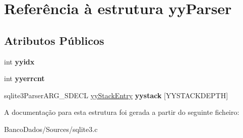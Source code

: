 \hypertarget{structyy_parser}{\section{Referência à estrutura yy\-Parser}
\label{structyy_parser}
}
\subsection*{Atributos Públicos}
\begin{DoxyCompactItemize}
\item 
\hypertarget{structyy_parser_a19abcf4780515fd2debd1ce7a2e29f95}{int {\bfseries yyidx}}\label{structyy_parser_a19abcf4780515fd2debd1ce7a2e29f95}

\item 
\hypertarget{structyy_parser_ac0350933aa515a3a756dfa742d04ee59}{int {\bfseries yyerrcnt}}\label{structyy_parser_ac0350933aa515a3a756dfa742d04ee59}

\item 
\hypertarget{structyy_parser_ae8bc1531d6ae56020a7ee33a40783672}{sqlite3\-Parser\-A\-R\-G\-\_\-\-S\-D\-E\-C\-L \hyperlink{structyy_stack_entry}{yy\-Stack\-Entry} {\bfseries yystack} \mbox{[}Y\-Y\-S\-T\-A\-C\-K\-D\-E\-P\-T\-H\mbox{]}}\label{structyy_parser_ae8bc1531d6ae56020a7ee33a40783672}

\end{DoxyCompactItemize}


A documentação para esta estrutura foi gerada a partir do seguinte ficheiro\-:\begin{DoxyCompactItemize}
\item 
Banco\-Dados/\-Sources/sqlite3.\-c\end{DoxyCompactItemize}
